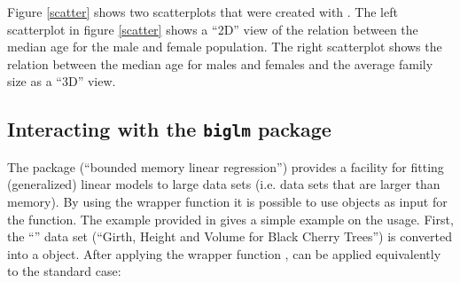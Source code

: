 \documentclass[12pt,a4paper]{article}
\begin{document}
Figure \ref{scatter} shows two scatterplots that were created with . 
The left scatterplot in figure \ref{scatter} shows a ``2D'' view of the relation between the median age for the male and female population. 
The right scatterplot shows the relation between the median age for males and females and the average family size as a ``3D'' view.


\subsection{Interacting with the \texttt{biglm} package}

The  package (``bounded memory linear regression'') provides a facility for fitting (generalized) linear models to large data sets (i.e. data sets that are larger than memory). 
By using the wrapper function  it is possible to use  objects as input for the  function. 
The example provided in  gives a simple example on the usage. 
First, the ``'' data set (``Girth, Height and Volume for Black Cherry Trees'') is converted into a  object. 
After applying the wrapper function ,  can be applied equivalently to the standard case:
\end{document}
